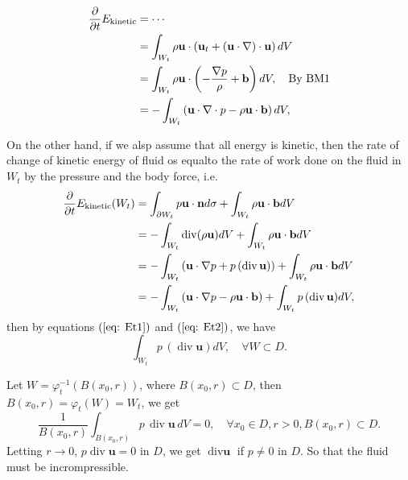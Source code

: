 
\begin{equation}
\begin{aligned}
\frac{\partial}{\partial t}E_{\rm kinetic}
&= \cdots\\
&= \int_{W_t}\rho \textbf{u}\cdot\left(\textbf{u}_t+(\textbf{u}\cdot \nabla)\cdot \textbf{u}\right)dV\\
&= \int_{W_t}\rho \textbf{u} \cdot \left(-\frac{\nabla p}{\rho} + \textbf{b}\right)dV,\quad\text{By BM1}\\
&= -\int_{W_t} \left(\textbf{u}\cdot \nabla \cdot p - \rho \textbf{u}\cdot \textbf{b}\right)dV,\label{eq: Et1}
\end{aligned}
\end{equation}

On the other hand, if we alsp assume that all energy is kinetic, then the rate of change of kinetic energy of fluid os equalto the rate of work done on the fluid in $W_t$ by the pressure and the body force, i.e.
\begin{equation}
\begin{aligned}
\frac{\partial}{\partial t}E_{\rm kinetic}(W_t)
&= \int_{\partial W_t} p\textbf{u}\cdot \textbf{n}d\sigma + \int_{W_t} \rho \textbf{u}\cdot\textbf{b}dV\\
&= -\int_{W_t} \operatorname{div}(\rho \textbf{u})dV + \int_{W_t} \rho \textbf{u}\cdot \textbf{b}dV\\
&= -\int_{W_t} \left(\textbf{u}\cdot \nabla p +p\,(\operatorname{div}\textbf{u})\right) + \int_{W_t} \rho \textbf{u}\cdot \textbf{b}dV\\
&= -\int_{W_t} \left(\textbf{u}\cdot \nabla p - \rho \textbf{u}\cdot \textbf{b}\right)
+ \int_{W_t} p\,(\operatorname{div}\textbf{u})dV,\label{eq: Et2}
\end{aligned}
\end{equation}
then by equations $(\ref{eq: Et1})$ and $(\ref{eq: Et2})$, we have
\begin{equation}
\int_{W_t} p\,(\operatorname{div}\textbf{u})dV,\quad \forall W\subset D.
\end{equation}


Let $W=\varphi_t^{-1}\left(B(x_0,r)\right)$, where $B(x_0,r)\subset D$, then $B(x_0,r) = \varphi_t(W)=W_t$, we get 
\begin{equation}
\frac{1}{B(x_0,r)}\int_{B(x_0,r)} p\,\operatorname{div}\textbf{u}\,dV=0,\quad \forall x_0\in D,r>0,B(x_0,r)\subset D.
\end{equation}
Letting $r\to 0$, $p\operatorname{div}\textbf{u} = 0$ in $D$, we get $\operatorname{div}\textbf{u}$ if $p\neq 0$ in $D$. So that the fluid must be incrompressible.



